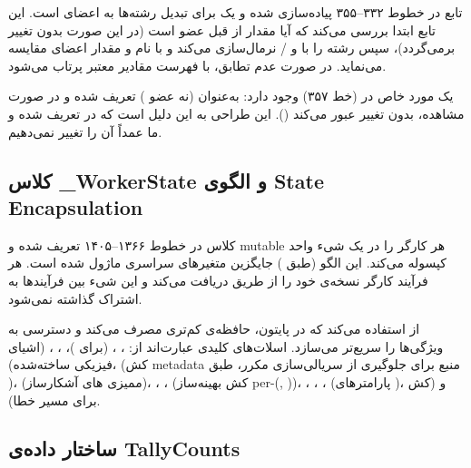 تابع  در خطوط ۳۳۲–۳۵۵ پیاده‌سازی شده و یک  برای تبدیل رشته‌ها به اعضای  است. این تابع ابتدا بررسی می‌کند که آیا مقدار از قبل عضو  است (در این صورت بدون تغییر برمی‌گردد)، سپس رشته را با  و / نرمال‌سازی می‌کند و با نام و مقدار اعضای  مقایسه می‌نماید. در صورت عدم تطابق،  با فهرست مقادیر معتبر پرتاب می‌شود.

یک مورد خاص در  (خط ۳۵۷) وجود دارد:  به‌عنوان  (نه عضو ) تعریف شده و در صورت مشاهده، بدون تغییر عبور می‌کند (). این طراحی به این دلیل است که  در  تعریف شده و ما عمداً آن را تغییر نمی‌دهیم.

\subsection{کلاس \_WorkerState و الگوی State Encapsulation}

کلاس  در خطوط ۱۳۶۶–۱۴۰۵ تعریف شده و  mutable هر کارگر را در یک شیء واحد کپسوله می‌کند. این الگو (طبق ) جایگزین متغیرهای سراسری ماژول شده است. هر فرآیند کارگر نسخه‌ی خود را از طریق  دریافت می‌کند و این شیء بین فرآیندها به اشتراک گذاشته نمی‌شود.

 از  استفاده می‌کند که در پایتون، حافظه‌ی کم‌تری مصرف می‌کند و دسترسی به ویژگی‌ها را سریع‌تر می‌سازد. اسلات‌های کلیدی عبارت‌اند از: ، ،  (برای )، ، ،  (اشیای فیزیکی ساخته‌شده)،  (کش metadata منبع برای جلوگیری از سریالی‌سازی مکرر، طبق )،  (ممیزی های آشکارساز)، ، ،  (کش بهینه‌ساز per-(, ))، ، ، ،  (پارامترهای )، و  (کش  برای مسیر خطا).

\subsection{ساختار داده‌ی TallyCounts}

